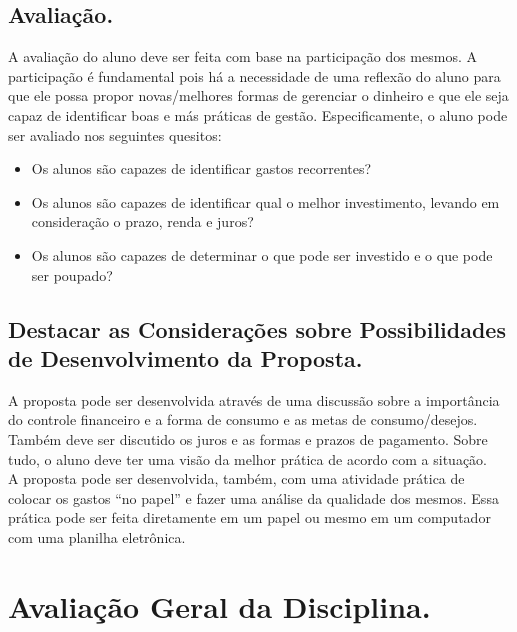 \documentclass[a4paper,12pt]{article}
\begin{document}
\subsection{Avaliação.}

A avaliação do aluno deve ser feita com base na participação dos mesmos. A participação é fundamental pois há a necessidade de uma reflexão do aluno para que ele possa propor novas/melhores formas de gerenciar o dinheiro e que ele seja capaz de identificar boas e más práticas de gestão. Especificamente, o aluno pode ser avaliado nos seguintes quesitos:
\begin{itemize}
\item Os alunos são capazes de identificar gastos recorrentes?
\item Os alunos são capazes de identificar qual o melhor investimento, levando em consideração o prazo, renda e juros?
\item Os alunos são capazes de determinar o que pode ser investido e o que pode ser poupado?
\end{itemize}

\subsection{Destacar as Considerações sobre Possibilidades de Desenvolvimento da Proposta.}

A proposta pode ser desenvolvida através de uma discussão sobre a importância do controle financeiro e a forma de consumo e as metas de consumo/desejos. Também deve ser discutido os juros e as formas e prazos de pagamento. Sobre tudo, o aluno deve ter uma visão da melhor prática de acordo com a situação.\\
A proposta pode ser desenvolvida, também, com uma atividade prática de colocar os gastos ``no papel'' e fazer uma análise da qualidade dos mesmos. Essa prática pode ser feita diretamente em um papel ou mesmo em um computador com uma planilha eletrônica.

\section{Avaliação Geral da Disciplina.}
\end{document}
